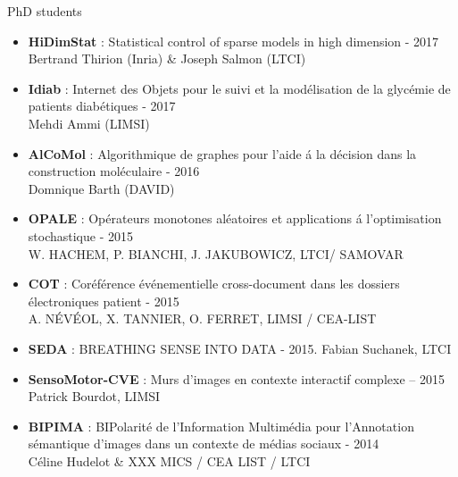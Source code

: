 \begin{frame}{PhD students}

\begin{itemize}
\item 
\small
\textbf{HiDimStat} : Statistical control of sparse models in high dimension - 2017
\\
Bertrand Thirion (Inria) \& Joseph Salmon (LTCI)
\item
\textbf{Idiab} : Internet des Objets pour le suivi et la mod\'elisation de la glyc\'emie de patients
diab\'etiques - 2017
\\
Mehdi Ammi (LIMSI)
\item
\textbf{AlCoMol} : Algorithmique de graphes pour l'aide \'a la d\'ecision dans la construction
mol\'eculaire - 2016
\\
Domnique Barth (DAVID)
\item 
\textbf{OPALE} : Op\'erateurs monotones al\'eatoires et applications \'a l'optimisation stochastique -
2015
\\
W. HACHEM, P. BIANCHI, J. JAKUBOWICZ, LTCI/ SAMOVAR
\item 
\textbf{COT} : Cor\'ef\'erence \'ev\'enementielle cross-document dans les dossiers \'electroniques
patient - 2015
\\
A. N\'EV\'EOL, X. TANNIER, O. FERRET, LIMSI / CEA-LIST
\item 
\textbf{SEDA} : BREATHING SENSE INTO DATA - 2015. Fabian Suchanek, LTCI
\item 
\textbf{SensoMotor-CVE} : Murs d'images en contexte interactif complexe – 2015
\\
Patrick Bourdot, LIMSI
\item
\textbf{BIPIMA} : BIPolarit\'e de l'Information Multim\'edia pour l'Annotation s\'emantique d'images
dans un contexte de m\'edias sociaux - 2014
\\
C\'eline Hudelot \& XXX  MICS / CEA LIST / LTCI
\end{itemize}
\end{frame}

